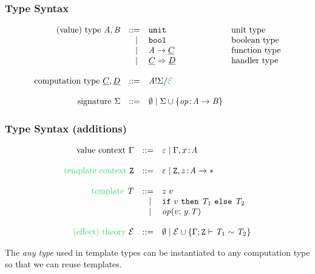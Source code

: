 \documentclass[usenames,dvipsnames]{beamer}
\begin{document}
\begin{frame}
  \frametitle{Type Syntax}
  \[
	\begin{array}{rrll}
		\text{(value) type}~\tyA, \tyB
		 & ::=   & \unittype          & \text{unit type}\\
		 & \vsep & \booltype          & \text{boolean type}\\
		 & \vsep & \tyA \to \ctyC     & \text{function type}\\
		 & \vsep & \ctyC \hto \ctyD   & \text{handler type}\\
		\\
		\text{computation type}~\ctyC, \ctyD
		 & ::=   & \ctype{\tyA}{\sig}{\new{\eqE}}\\
		\\
		\text{signature}~\sig
		 & ::=   & \nil \vsep \sig \union \set{{\op \oftype \tyA \to \tyB}}\\
	\end{array}
\]


\end{frame}
\begin{frame}
  \frametitle{Type Syntax (additions)}
  \[
	\begin{array}{rrll}
		\text{value context}~\ctx
		 & ::=   & \varepsilon \vsep \ctx, x \oftype \tyA \\
		\\
		\new{ \text{template context}}~\tvars
		 & ::=   & \varepsilon \vsep \tvars, z \oftype \tyA \to \anytype \\
    \\
		\new{\text{template}}~\tmplT
		 & ::=   & \apply{z}{v} \\
		 & \vsep & \ifclause{v}{\tmplT_1}{\tmplT_2} \\
		 & \vsep & \operation{v}{y.\tmplT} \\
		\\
		\new{\text{(effect) theory}}~\eqE
		 & ::=   & \nil \vsep \eqE \union
		\set{\teqjudgement{\tenv}{\tmplT_1 \rel \tmplT_2}}\\
	\end{array}
  \]
  
  The \emph{any type} \new{$\anytype$} used in template types can be instantiated to any computation type so that we can reuse templates.
\end{frame}
\end{document}
